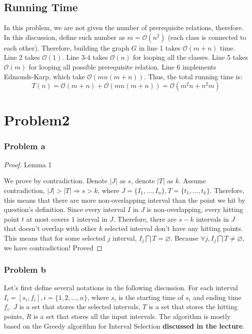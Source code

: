 \documentclass[openany]{article}
\begin{document}
\subsection*{Running Time}
In this problem, we are not given the number of prerequisite relations, therefore. In this discussion, define such number as $m = \mathcal{O}(n^2)$ (each class is connected to each other). Therefore, building the graph $G$ in line 1 takes $\mathcal{O}(m+n)$ time. Line 2 takes $\mathcal{O}(1)$. Line 3-4 takes $\mathcal{O}(n)$ for looping all the classes. Line 5 takes $\mathcal{O}(m)$ for looping all possible prerequisite relation. Line 6 implements Edmonds-Karp, which take $\mathcal{O}(mn(m+n))$. Thus, the total running time is:
\[T(n) = \mathcal{O}(m+n)+\mathcal{O}(mn(m+n)) = \mathcal{O}(m^2n+n^2m)\]

\section*{Problem2}

\subsubsection*{Problem a}
\begin{proof}[Proof]{Lemma 1}

    We prove by contradiction. Denote $|J|$ as $s$, denote $|T|$ as $k$. Assume contradiction, $|J| > |T| \Rightarrow s > k$, where $J = \{I_1, ..., I_n\}, T=\{t_1, ..., t_k\}$.  Therefore, this means that there are more non-overlapping interval than the point we hit by question's definition. Since every interval $I$ in $J$ is non-overlapping, every hitting point $t$ at most covers $1$ interval in $J$. Therefore, there are $s-k$ intervals in $J$ that doesn't overlap with other $k$ selected interval don't have any hitting points. This means that for some selected $j$ interval, $I_j\bigcap T =\varnothing$. Because $\forall j, I_j \bigcap T \neq \varnothing$, we have contradiction! Proved
\end{proof}

\subsubsection*{Problem b}
Let's first define several notations in the following discussion. For each interval $I_i = [s_i, f_i], i = \{1,2,...,n\}$, where $s_i$ is the starting time of $s_i$ and ending time $f_i$. $J$ is a set that stores the selected intervals, $T$ is a set that stores the hitting points, $R$ is a set that stores all the input intervals. The algorithm is mostly based on the Greedy algorithm for Interval Selection \textbf{discussed in the lecture}.
\end{document}
